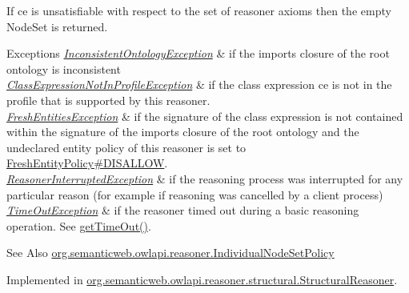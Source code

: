 If ce is unsatisfiable with respect to the set of reasoner axioms then the empty {\ttfamily Node\-Set} is returned. 
\begin{DoxyExceptions}{Exceptions}
{\em \hyperlink{classorg_1_1semanticweb_1_1owlapi_1_1reasoner_1_1_inconsistent_ontology_exception}{Inconsistent\-Ontology\-Exception}} & if the imports closure of the root ontology is inconsistent \\
\hline
{\em \hyperlink{classorg_1_1semanticweb_1_1owlapi_1_1reasoner_1_1_class_expression_not_in_profile_exception}{Class\-Expression\-Not\-In\-Profile\-Exception}} & if the class expression {\ttfamily ce} is not in the profile that is supported by this reasoner. \\
\hline
{\em \hyperlink{classorg_1_1semanticweb_1_1owlapi_1_1reasoner_1_1_fresh_entities_exception}{Fresh\-Entities\-Exception}} & if the signature of the class expression is not contained within the signature of the imports closure of the root ontology and the undeclared entity policy of this reasoner is set to \hyperlink{enumorg_1_1semanticweb_1_1owlapi_1_1reasoner_1_1_fresh_entity_policy_a762eae6d5b2449d125311ecaabfdc8d0}{Fresh\-Entity\-Policy\#\-D\-I\-S\-A\-L\-L\-O\-W}. \\
\hline
{\em \hyperlink{classorg_1_1semanticweb_1_1owlapi_1_1reasoner_1_1_reasoner_interrupted_exception}{Reasoner\-Interrupted\-Exception}} & if the reasoning process was interrupted for any particular reason (for example if reasoning was cancelled by a client process) \\
\hline
{\em \hyperlink{classorg_1_1semanticweb_1_1owlapi_1_1reasoner_1_1_time_out_exception}{Time\-Out\-Exception}} & if the reasoner timed out during a basic reasoning operation. See \hyperlink{interfaceorg_1_1semanticweb_1_1owlapi_1_1reasoner_1_1_o_w_l_reasoner_a44b2c968f989afe5290db29c90faa164}{get\-Time\-Out()}. \\
\hline
\end{DoxyExceptions}
\begin{DoxySeeAlso}{See Also}
\hyperlink{enumorg_1_1semanticweb_1_1owlapi_1_1reasoner_1_1_individual_node_set_policy}{org.\-semanticweb.\-owlapi.\-reasoner.\-Individual\-Node\-Set\-Policy} 
\end{DoxySeeAlso}


Implemented in \hyperlink{classorg_1_1semanticweb_1_1owlapi_1_1reasoner_1_1structural_1_1_structural_reasoner_a32479d4be4145033090caa2209170b53}{org.\-semanticweb.\-owlapi.\-reasoner.\-structural.\-Structural\-Reasoner}.

